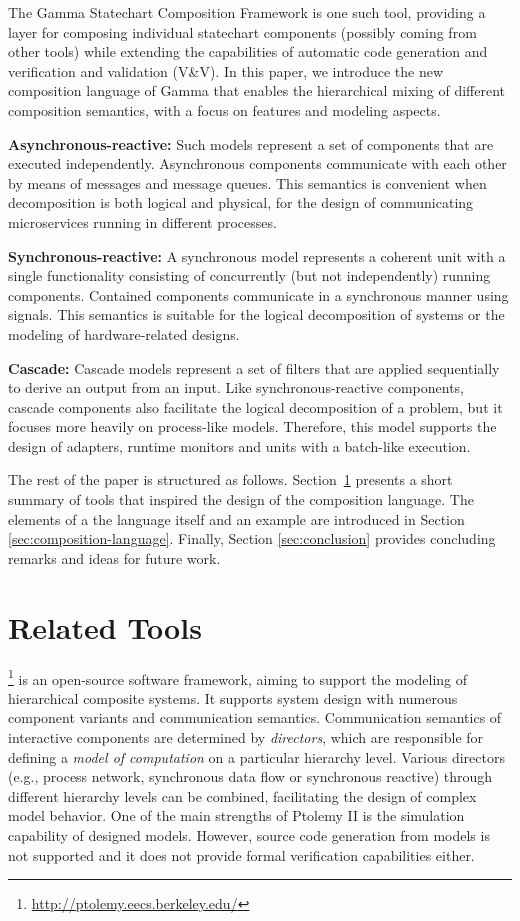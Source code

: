 The Gamma Statechart Composition Framework is one such tool, providing a layer for composing individual statechart components (possibly coming from other tools) while extending the capabilities of automatic code generation and verification and validation (V\&V). In this paper, we introduce the new composition language of Gamma that enables the hierarchical mixing of different composition semantics, with a focus on features and modeling aspects.

\textbf{Asynchronous-reactive:} Such models represent a set of components that are executed independently. Asynchronous components communicate with each other by means of messages and message queues. This semantics is convenient when decomposition is both logical and physical, \eg for the design of communicating microservices running in different processes.
	
\textbf{Synchronous-reactive:} A synchronous model represents a coherent unit with a single functionality consisting of concurrently (but not independently) running components. Contained components communicate in a synchronous manner using signals. This semantics is suitable for the logical decomposition of systems or the modeling of hardware-related designs.
	
\textbf{Cascade:} Cascade models represent a set of filters that are applied sequentially to derive an output from an input. Like synchronous-reactive components, cascade components also facilitate the logical decomposition of a problem, but it focuses more heavily on process-like models. Therefore, this model supports the design of adapters, runtime monitors and units with a batch-like execution.

The rest of the paper is structured as follows. Section~\ref{sec:related-tools} presents a short summary of tools that inspired the design of the composition language. The elements of a the language itself and an example are introduced in Section \ref{sec:composition-language}. Finally, Section \ref{sec:conclusion} provides concluding remarks and ideas for future work.

\section{Related Tools}
\label{sec:related-tools}

\ptolemy\footnote{\url{http://ptolemy.eecs.berkeley.edu/}} \cite{ptolemy,ptolemy2} is an open-source software framework, aiming to support
the modeling of hierarchical composite systems. It supports system design with numerous component variants and communication semantics. Communication semantics of interactive components are determined by \emph{directors}, which are responsible for defining a \emph{model of computation} on a particular hierarchy level. Various directors (e.g., process network, synchronous data flow
or synchronous reactive) through different hierarchy levels can be combined, facilitating the design of complex model behavior. One of the main strengths of Ptolemy II is the simulation capability of designed models. However, source code generation from models is not supported and it does not provide formal verification capabilities either.

